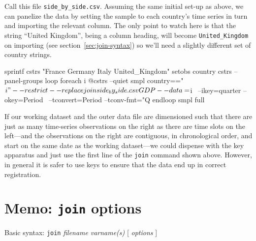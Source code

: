 Call this file \verb|side_by_side.csv|.  Assuming the same initial
set-up as above, we can panelize the data by setting the sample to
each country's time series in turn and importing the relevant
column. The only point to watch here is that the string ``United
Kingdom'', being a column heading, will become \verb|United_Kingdom|
on importing (see section~\ref{sec:join-syntax}) so we'll need a
slightly different set of country strings.
%
\begin{code}
sprintf cstrs "France Germany Italy United_Kingdom"
setobs country cstrs --panel-groups
loop foreach i @cstrs --quiet
  smpl country=="$i" --restrict --replace
  join side_by_side.csv GDP --data=$i \
  --ikey=quarter --okey=Period \
  --tconvert=Period --tconv-fmt="Q%
endloop
smpl full
\end{code}

If our working dataset and the outer data file are dimensioned such
that there are just as many time-series observations on the right as
there are time slots on the left---and the observations on the right
are contiguous, in chronological order, and start on the same date as
the working dataset---we could dispense with the key apparatus and
just use the first line of the \texttt{join} command shown
above. However, in general it is safer to use keys to ensure that the
data end up in correct registration.

\section{Memo: \texttt{join} options}
\label{sec:join-options}

Basic syntax: \texttt{join} \textsl{filename} \textsl{varname(s)} [
\textsl{options} ]

